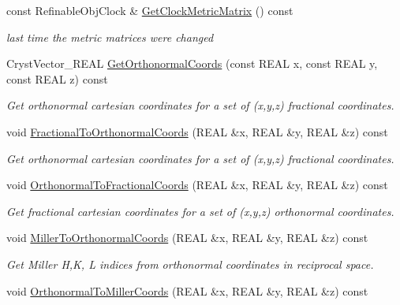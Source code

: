 \begin{DoxyCompactItemize}
\mbox{\label{class_obj_cryst_1_1_unit_cell_a43d3c39eeb3b8b9f98e5891057ce9b57}} 
const Refinable\+Obj\+Clock \& \mbox{\hyperlink{class_obj_cryst_1_1_unit_cell_a43d3c39eeb3b8b9f98e5891057ce9b57}{Get\+Clock\+Metric\+Matrix}} () const
\begin{DoxyCompactList}\small\item\em last time the metric matrices were changed \end{DoxyCompactList}\item 
Cryst\+Vector\+\_\+\+R\+E\+AL \mbox{\hyperlink{class_obj_cryst_1_1_unit_cell_a139524dca8d88544f6f2bf5ec4f1830a}{Get\+Orthonormal\+Coords}} (const R\+E\+AL x, const R\+E\+AL y, const R\+E\+AL z) const
\begin{DoxyCompactList}\small\item\em Get orthonormal cartesian coordinates for a set of (x,y,z) fractional coordinates. \end{DoxyCompactList}\item 
void \mbox{\hyperlink{class_obj_cryst_1_1_unit_cell_ae450547d6d700cd21accfb3a05d8192f}{Fractional\+To\+Orthonormal\+Coords}} (R\+E\+AL \&x, R\+E\+AL \&y, R\+E\+AL \&z) const
\begin{DoxyCompactList}\small\item\em Get orthonormal cartesian coordinates for a set of (x,y,z) fractional coordinates. \end{DoxyCompactList}\item 
void \mbox{\hyperlink{class_obj_cryst_1_1_unit_cell_a69debaf9dc539baf3c5ccc599ae614cd}{Orthonormal\+To\+Fractional\+Coords}} (R\+E\+AL \&x, R\+E\+AL \&y, R\+E\+AL \&z) const
\begin{DoxyCompactList}\small\item\em Get fractional cartesian coordinates for a set of (x,y,z) orthonormal coordinates. \end{DoxyCompactList}\item 
void \mbox{\hyperlink{class_obj_cryst_1_1_unit_cell_a2c9490f42bf9fa2438eb311ac46fd448}{Miller\+To\+Orthonormal\+Coords}} (R\+E\+AL \&x, R\+E\+AL \&y, R\+E\+AL \&z) const
\begin{DoxyCompactList}\small\item\em Get Miller H,K, L indices from orthonormal coordinates in reciprocal space. \end{DoxyCompactList}\item 
void \mbox{\hyperlink{class_obj_cryst_1_1_unit_cell_ab262e1d0d584be0fce2337729dd418f5}{Orthonormal\+To\+Miller\+Coords}} (R\+E\+AL \&x, R\+E\+AL \&y, R\+E\+AL \&z) const

\end{DoxyCompactItemize}
